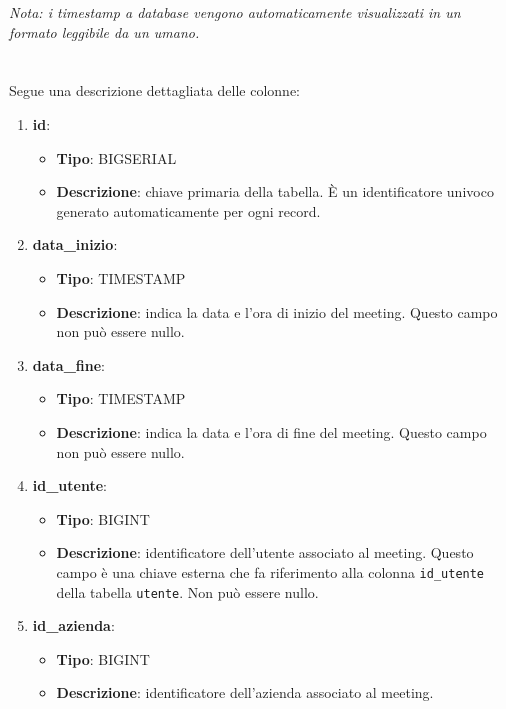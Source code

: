 \textit{Nota: i timestamp a database vengono automaticamente visualizzati in un formato leggibile da un umano.}
\\
\\
\\
Segue una descrizione dettagliata delle colonne:
\begin{enumerate}
    \item \textbf{id}:
        \begin{itemize}
            \item \textbf{Tipo}: BIGSERIAL
            \item \textbf{Descrizione}: chiave primaria della tabella. È un identificatore univoco generato automaticamente per ogni record.
        \end{itemize}
    \item \textbf{data_inizio}:
        \begin{itemize}
            \item \textbf{Tipo}: TIMESTAMP
            \item \textbf{Descrizione}: indica la data e l'ora di inizio del meeting. Questo campo non può essere nullo.
        \end{itemize}
    \item \textbf{data_fine}:
        \begin{itemize}
            \item \textbf{Tipo}: TIMESTAMP
            \item \textbf{Descrizione}: indica la data e l'ora di fine del meeting. Questo campo non può essere nullo.
        \end{itemize}
    \item \textbf{id_utente}:
        \begin{itemize}
            \item \textbf{Tipo}: BIGINT
            \item \textbf{Descrizione}: identificatore dell'utente associato al meeting. 
            Questo campo è una chiave esterna che fa riferimento alla colonna \texttt{id_utente} della tabella \texttt{utente}. 
            Non può essere nullo.
        \end{itemize}
    \item \textbf{id_azienda}:
        \begin{itemize}
            \item \textbf{Tipo}: BIGINT
            \item \textbf{Descrizione}: identificatore dell'azienda associato al meeting.  \\

\end{itemize}
\end{enumerate}
